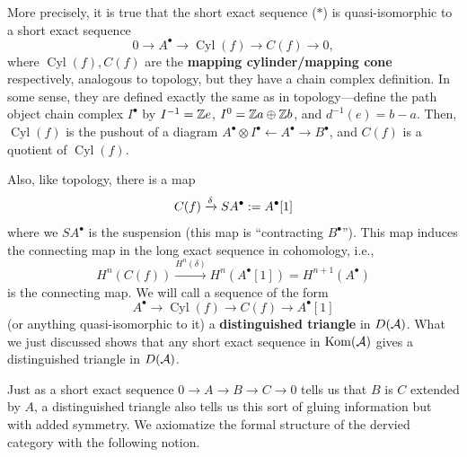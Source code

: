 \documentclass[12pt]{article}
\DeclareMathOperator{\Kom}{Kom}
\DeclareMathOperator{\Cyl}{Cyl}
\begin{document}
More precisely, it is true that the short exact sequence ($*$) is quasi-isomorphic to a short exact sequence
\[0 \to A^\bullet \to \Cyl(f) \to C(f) \to 0,\]
where $\Cyl(f),C(f)$ are the \textbf{mapping cylinder/mapping cone} respectively, analogous to topology, but they have a chain complex definition. In some sense, they are defined exactly the same as in topology---define the path object chain complex $I^\bullet$ by $I^{-1}=\mathbb{Z} e$, $I^{0}=\mathbb{Z} a \oplus \mathbb{Z} b$, and $d^{-1}(e)=b-a$. Then, $\Cyl(f)$ is the pushout of a diagram $A^\bullet \otimes I^\bullet \leftarrow A^\bullet \rightarrow B^\bullet$, and $C(f)$ is a quotient of $\Cyl(f)$.

Also, like topology, there is a map
\[C(f) \xrightarrow{\delta} SA^\bullet := A^\bullet[1]\]
where we $SA^\bullet$ is the suspension (this map is ``contracting $B^\bullet$''). This map induces the connecting map in the long exact sequence in cohomology, i.e.,
\[H^n(C(f)) \xrightarrow{H^n(\delta)} H^n(A^\bullet[1]) = H^{n+1}(A^\bullet)\]
is the connecting map. We will call a sequence of the form
\[A^\bullet \to \Cyl(f) \to C(f) \to A^\bullet[1]\]
(or anything quasi-isomorphic to it) a \textbf{distinguished triangle} in $D(\mathcal{A})$. What we just discussed shows that any short exact sequence in $\Kom(\cA)$ gives a distinguished triangle in $D(\mathcal{A})$.

Just as a short exact sequence $0\to A\to B\to C\to 0$ tells us that $B$ is $C$ extended by $A$, a distinguished triangle also tells us this sort of gluing information but with added symmetry. We axiomatize the formal structure of the dervied category with the following notion.
\end{document}
